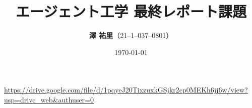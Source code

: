 \documentclass[dvipdfmx]{jsarticle}
\begin{document}
\title{\vspace{10zw}エージェント工学 最終レポート課題 \\}
\date{\today} %
\author{\Large{\textbf{澤 \/ 祐里}}（21--1--037--0801）} %

\thispagestyle{empty}
\maketitle
\thispagestyle{empty}
\clearpage

\setcounter{page}{1}
\setcounter{secnumdepth}{4}
\setcounter{tocdepth}{4}
\hypertarget{mokuji}{\tableofcontents}
\clearpage



\clearpage


\clearpage

%

%

\begin{thebibliography}{9}
   \url{https://drive.google.com/file/d/1pqyeJ20TixzuxkGSjkr2cp0MEKh6jj6w/view?usp=drive_web&authuser=0}
\end{thebibliography}
\end{document}
